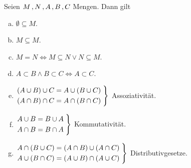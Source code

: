 \documentclass[../ana1.tex]{subfiles}
\begin{document}
\begin{bem} Seien \(M\operatorname{,} N\operatorname{,} A\operatorname{,} B\operatorname{,} C \) Mengen. Dann gilt
	\begin{enumerate}[(a)]
		\item \(\emptyset \subseteq M \).
		\item \(M \subseteq M \).
		\item \(M = N \iff M \subseteq N \vee N \subseteq M \).
		\item \(A\subset B \wedge B \subset C \iff A \subset C \).
		\item \(\begin{rcases*}
					(A\cup B) \cup C = A \cup (B \cup C)\;\\
					(A\cap B) \cap C = A \cap (B \cap C)\;
			    \end{rcases*} \) Assoziativität.
		\item \(\begin{rcases*}
			    	A\cup B = B \cup A\;\\
		        	A\cap B = B \cap A\;
			    \end{rcases*} \) Kommutativität.
		\item \(\begin{rcases*}
			    	A \cap (B\cup C) = (A\cap B) \cup (A\cap C)\;\\
			    	A \cup (B\cap C) = (A\cup B) \cap (A\cup C)\;
			    \end{rcases*} \) Distributivgesetze.
	\end{enumerate}
\end{bem}
\end{document}
